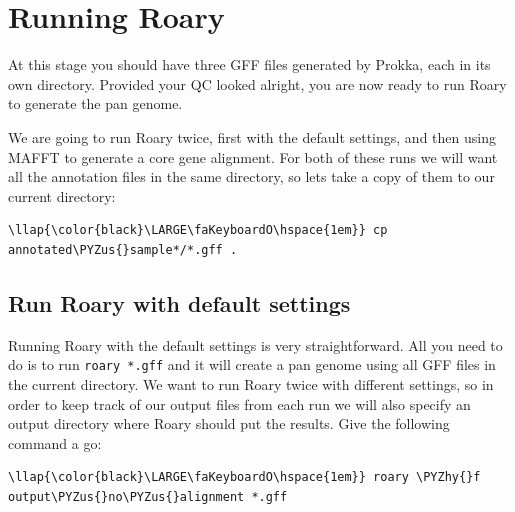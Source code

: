 \documentclass[11pt]{article}
\def\PYZus{\char`\_}
\def\PYZhy{\char`\-}
\begin{document}
\newpage






    \hypertarget{running-roary}{%
\section{Running Roary}\label{running-roary}}

At this stage you should have three GFF files generated by Prokka, each
in its own directory. Provided your QC looked alright, you are now ready
to run Roary to generate the pan genome.

We are going to run Roary twice, first with the default settings, and
then using MAFFT to generate a core gene alignment. For both of these
runs we will want all the annotation files in the same directory, so
lets take a copy of them to our current directory:

\begin{terminalinput}
\begin{Verbatim}[commandchars=\\\{\}]
\llap{\color{black}\LARGE\faKeyboardO\hspace{1em}} cp annotated\PYZus{}sample*/*.gff .
\end{Verbatim}
\end{terminalinput}

    \hypertarget{run-roary-with-default-settings}{%
\subsection{Run Roary with default
settings}\label{run-roary-with-default-settings}}

Running Roary with the default settings is very straightforward. All you
need to do is to run \texttt{roary\ *.gff} and it will create a pan
genome using all GFF files in the current directory. We want to run
Roary twice with different settings, so in order to keep track of our
output files from each run we will also specify an output directory
where Roary should put the results. Give the following command a go:

\begin{terminalinput}
\begin{Verbatim}[commandchars=\\\{\}]
\llap{\color{black}\LARGE\faKeyboardO\hspace{1em}} roary \PYZhy{}f output\PYZus{}no\PYZus{}alignment *.gff
\end{Verbatim}
\end{terminalinput}
\end{document}
